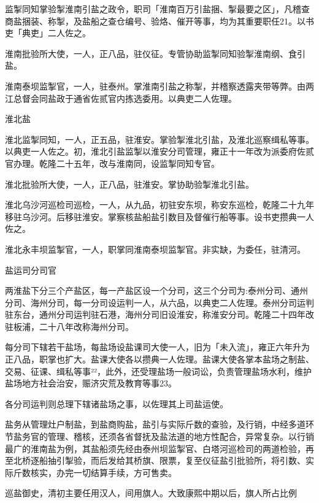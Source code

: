 监掣同知掌验掣淮南引盐之政令，职司「淮南百万引盐捆、掣最要之区」，凡稽查商盐捆装、称掣，及盐船之查仓编号、验烙、催开等事，均为其重要职任21。以书吏「典吏」二人佐之。

淮南批验所大使，一人，正八品，驻仪征。专管协助监掣同知验掣淮南纲、食引盐。

淮南泰坝监掣官，一人，驻泰州。掌淮南引盐之称掣，并稽察透露夹带等弊。由两江总督会同盐政于通省佐贰官内拣选委用。以典吏二人佐理。

淮北盐

淮北监掣同知，一人，正五品，驻淮安。掌验掣淮北引盐，及淮北巡察缉私等事。以典吏一人佐之。初，淮北引盐监掣以淮安分司管理，雍正十一年改为派委府佐贰官办理。乾隆二十五年，改与淮南同，设监掣同知专官。

淮北批验所大使，一人，正八品，驻淮安。掌协助验掣淮北引盐。

\vfill
\begin{BookNotes}
\end{BookNotes}

淮北乌沙河巡检司巡检，一人，从九品，初驻安东坝，称安东巡检，乾隆二十九年移驻乌沙河。后移驻淮安。掌察核盐船盐引数目及督催行船等事。设书吏攒典一人佐之。

淮北永丰坝监掣官，一人，职掌同淮南泰坝监掣官。非实缺，为委任，驻清河。

盐运司分司官

两淮盐下分三个产盐区，每一产盐区设一个分司，这三个分司为:泰州分司、通州分司、海州分司，每一分司设运判一人，从六品，以典吏二人佐理。泰州分司运判驻东台，通州分司运判驻石港，海州分司旧设淮安，称淮安分司。乾隆二十四年改驻板浦，二十八年改称海州分司。

每分司下辖若干盐场，每盐场设盐课司大使一人，旧为「未入流」，雍正六年升为正八品，职掌也扩大。盐课大使各以攒典一人佐理。盐课大使各掌本盐场之制盐、交易、征课、缉私等事²²，此外，还受理盐场一般词讼，负责管理盐场水利，维护盐场地方社会治安，赈济灾荒及教育等事23。

各分司运判则总理下辖诸盐场之事，以佐理其上司盐运使。

盐务从管理灶户制盐，到盐商购盐，盐引与实际斤数的查验，及行销，中经多道环节盐务官的管理、稽核，还须各省督抚及盐法道的地方性配合，异常复杂。以行销最广的淮南盐为例，其盐船须先经由泰州坝监掣官、白塔河巡检司的两道检验，再至北桥逐船抽引掣验，而后发给其桥旗、限票，复至仪征盐引批验所，将引数、实际斤数核实，办完一切结算手续，方可售卖。

巡盐御史，清初主要任用汉人，间用旗人。大致康熙中期以后，旗人所占比例

